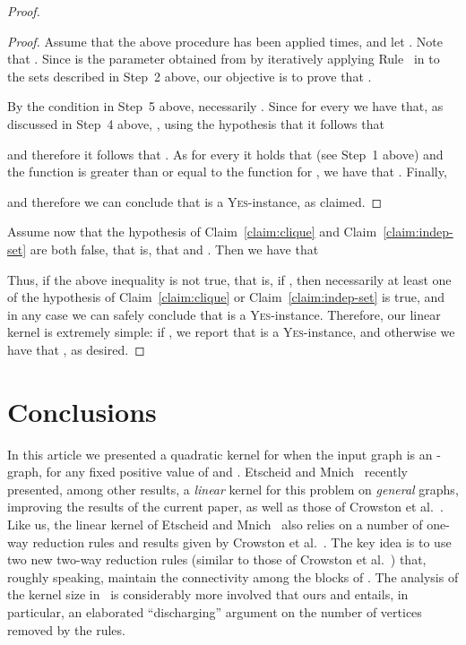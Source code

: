 \documentclass[
final
]{dmtcs-episciences}
\begin{document}
\begin{proof}
\begin{proof}
Assume that the above procedure has been applied  times, and let . Note that . Since  is the parameter obtained from  by iteratively applying Rule~ in  to the sets described in Step~2 above, our objective is to prove that .

By the condition in Step~5 above, necessarily . Since for every  we have that, as discussed in Step~4 above, , using the hypothesis that  it follows that

and therefore it follows that . As for every  it holds that  (see Step~1 above) and the function  is greater than or equal to the function  for , we have that . Finally,

and therefore we can conclude that   is a \textsc{Yes}-instance, as claimed.
\end{proof}

Assume now that the hypothesis of Claim~\ref{claim:clique} and Claim~\ref{claim:indep-set} are both false, that is, that  and . Then we have that


Thus, if the above inequality is not true, that is, if , then necessarily at least one of the hypothesis of Claim~\ref{claim:clique} or Claim~\ref{claim:indep-set} is true, and in any case we can safely conclude that  is a \textsc{Yes}-instance. Therefore, our linear kernel is extremely simple: if , we report that  is a \textsc{Yes}-instance, and otherwise we have that , as desired.\end{proof}


\newpage

\section{Conclusions}
\label{sec:conclusions}



In this article we presented a quadratic kernel for  {} when the input graph is an -graph, for any fixed positive value of  and . Etscheid and Mnich~\cite{EtscheidM16} recently presented, among other results, a {\sl linear} kernel for this problem on {\sl general} graphs, improving the results of the current paper, as well as those of Crowston et al.~\cite{crowston2012max}. Like us, the linear kernel of Etscheid and Mnich~\cite{EtscheidM16} also relies on a number of one-way reduction rules and results given by Crowston et al.~\cite{crowston2012max}. The key idea is to use two new two-way reduction rules (similar to those of Crowston et al.~\cite{crowston2012max}) that, roughly speaking, maintain the connectivity among the blocks of . The analysis of the kernel size in~\cite{EtscheidM16} is considerably more involved that ours and entails, in particular, an elaborated ``discharging'' argument on the number of vertices removed by the rules.
\end{document}
